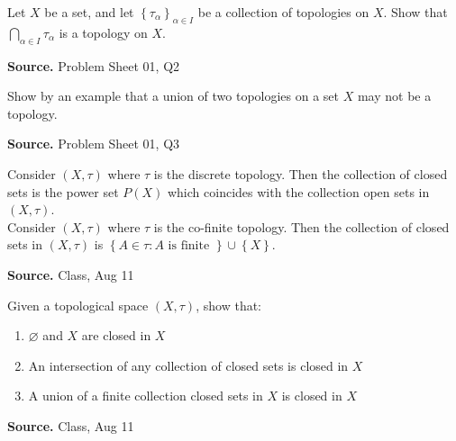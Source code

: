 \documentclass[12pt,twoside]{report}
\newenvironment*{source}{\hfill\scriptsize\textbf{Source.}\space}{\par}
\begin{document}
\begin{samepage}
\begin{ex}
Let $X$ be a set, and let $ \left\{ \tau_\alpha \right\}_{ \alpha \in I } $ be a collection of topologies on $X$. 
Show that $ \displaystyle\bigcap_{\alpha \in I} \tau_\alpha $ is a topology on $X$.
\end{ex}
\begin{source}
Problem Sheet 01, Q2
\end{source}
\end{samepage}

\begin{samepage}
\begin{ex}
Show by an example that a union of two topologies on a set $X$ may not be a topology.
\end{ex}
\begin{source}
Problem Sheet 01, Q3
\end{source}
\end{samepage}

\begin{samepage}
\begin{ex}
Consider $\left (X, \tau\right )$ where $\tau$ is the discrete topology. Then the collection of closed sets is the power set $P\left (X\right )$ which coincides with the collection open sets in $\left (X, \tau\right )$.\\
Consider $\left (X, \tau\right )$ where $\tau$ is the co-finite topology. Then the collection of closed sets in $\left (X, \tau\right )$ is $ \left\{ A \in \tau  :  A \text{ is finite } \right\} \cup \left\{ X \right\} $.
\end{ex}
\begin{source}
Class, Aug 11
\end{source}
\end{samepage}

\begin{samepage}
\begin{ex}
 Given a topological space $\left (X, \tau\right )$, show that:
    \begin{enumerate}
        \item $\varnothing$ and $X$ are closed in $X$
        \item An intersection of any collection of closed sets is closed in $X$
        \item A union of a finite collection closed sets in $X$ is closed in $X$
    \end{enumerate}
\end{ex}
\begin{source}
Class, Aug 11
\end{source}
\end{samepage}
\end{document}
